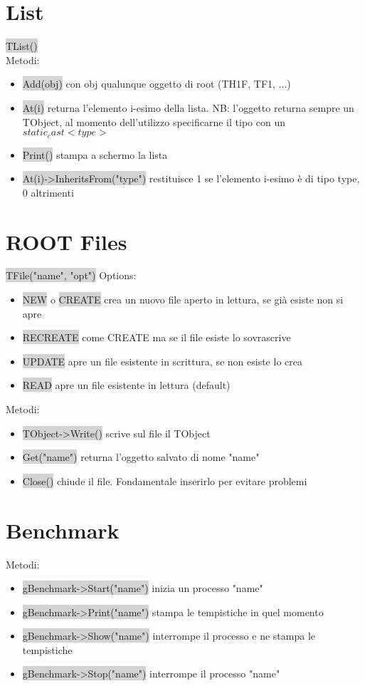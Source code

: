\documentclass[a4paper]{article}
\begin{document}
\section{List}
    \colorbox{LightGray}{TList()}\\
    Metodi:
    \begin{itemize}
        \item \colorbox{LightGray}{Add(obj)} con obj qualunque oggetto di root (TH1F, TF1, ...)
        \item \colorbox{LightGray}{At(i)} returna l'elemento i-esimo della lista. NB: l'oggetto returna sempre un TObject, al momento dell'utilizzo specificarne il tipo con un $static_cast<type>$
        \item \colorbox{LightGray}{Print()} stampa a schermo la lista
        \item \colorbox{LightGray}{At(i)->InheritsFrom("type")} restituisce 1 se l'elemento i-esimo è di tipo type, 0 altrimenti
    \end{itemize}
\section{ROOT Files}
    \colorbox{LightGray}{TFile("name", "opt")}
    Options:
    \begin{itemize}
        \item \colorbox{LightGray}{NEW} o \colorbox{LightGray}{CREATE} crea un nuovo file aperto in lettura, se già esiste non si apre
        \item \colorbox{LightGray}{RECREATE} come CREATE ma se il file esiste lo sovrascrive
        \item \colorbox{LightGray}{UPDATE} apre un file esistente in scrittura, se non esiste lo crea
        \item \colorbox{LightGray}{READ} apre un file esistente in lettura (default)
    \end{itemize}
    Metodi:
    \begin{itemize}
        \item \colorbox{LightGray}{TObject->Write()} scrive sul file il TObject
        \item \colorbox{LightGray}{Get("name")} returna l'oggetto salvato di nome "name"
        \item \colorbox{LightGray}{Close()} chiude il file. Fondamentale inserirlo per evitare problemi
    \end{itemize}
\section{Benchmark}
    Metodi:
    \begin{itemize}
        \item \colorbox{LightGray}{gBenchmark->Start("name")} inizia un processo "name"
        \item \colorbox{LightGray}{gBenchmark->Print("name")} stampa le tempistiche in quel momento
        \item \colorbox{LightGray}{gBenchmark->Show("name")} interrompe il processo e ne stampa le tempistiche
        \item \colorbox{LightGray}{gBenchmark->Stop("name")} interrompe il processo "name"
    \end{itemize}
\end{document}
